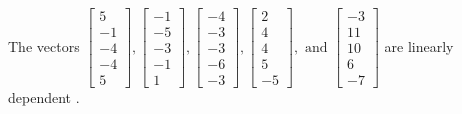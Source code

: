 \begin{exercise}
\begin{exerciseStatement}
  \end{exerciseStatement}
  \begin{exerciseAnswer}
   The vectors \(\left[\begin{array}{r}
5 \\
-1 \\
-4 \\
-4 \\
5
\end{array}\right] , \left[\begin{array}{r}
-1 \\
-5 \\
-3 \\
-1 \\
1
\end{array}\right] , \left[\begin{array}{r}
-4 \\
-3 \\
-3 \\
-6 \\
-3
\end{array}\right] , \left[\begin{array}{r}
2 \\
4 \\
4 \\
5 \\
-5
\end{array}\right] , \text{ and } \left[\begin{array}{r}
-3 \\
11 \\
10 \\
6 \\
-7
\end{array}\right]\) are 
  	 linearly dependent  .
  


  \end{exerciseAnswer}
\end{exercise}